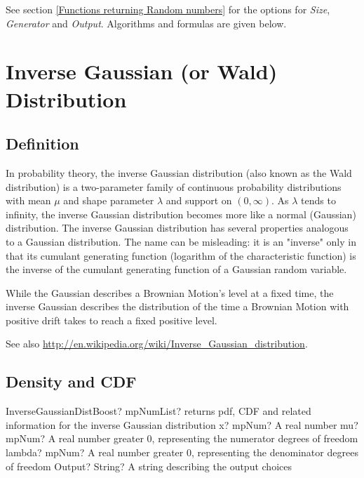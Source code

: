 \vspace{0.3cm}

See section \ref{Functions returning Random numbers} for the options for  {\itshape\sffamily Size},  {\itshape\sffamily Generator} and {\itshape\sffamily Output}. Algorithms and formulas are given below.





\section{Inverse Gaussian (or Wald) Distribution}


\subsection{Definition}
\label{InverseGaussianDistributionDefinition}

In probability theory, the inverse Gaussian distribution (also known as the Wald distribution) is a two-parameter family of continuous probability distributions  with mean $\mu$ and shape parameter $\lambda$ and support on $(0,\infty)$.
As $\lambda$ tends to infinity, the inverse Gaussian distribution becomes more like a normal (Gaussian) distribution. The inverse Gaussian distribution has several properties analogous to a Gaussian distribution. The name can be misleading: it is an "inverse" only in that its cumulant generating function (logarithm of the characteristic function) is the inverse of the cumulant generating function of a Gaussian random variable.

While the Gaussian describes a Brownian Motion's level at a fixed time, the inverse Gaussian describes the distribution of the time a Brownian Motion with positive drift takes to reach a fixed positive level.

See also \href{http://en.wikipedia.org/wiki/Inverse_Gaussian_distribution}{http://en.wikipedia.org/wiki/Inverse\_Gaussian\_distribution}. 


\subsection{Density and CDF}

\begin{mpFunctionsExtract}
	\mpFunctionFour
	{InverseGaussianDistBoost? mpNumList? returns pdf, CDF and related information for the inverse Gaussian distribution}
	{x? mpNum? A real number}
	{mu? mpNum? A real number greater 0, representing the numerator  degrees of freedom}
	{lambda? mpNum? A real number greater 0, representing the denominator degrees of freedom}
	{Output? String? A string describing the output choices}
\end{mpFunctionsExtract}


